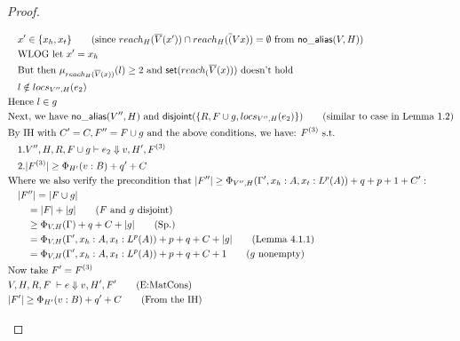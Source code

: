 \documentclass[11pt]{article}
\newcommand{\ms}[1]{\ensuremath{\mathsf{#1}}}
\newcommand{\na}[1]{\mathsf{no\_alias}(#1)}
\newcommand{\dist}[1]{\mathsf{disjoint}(#1)}
\begin{document}
\begin{proof}
\begin{description}
\begin{align*}
  &\quad x' \in \{x_h,x_t\} \tag{since $reach_H(\overline V (x')) \cap reach_H(\overline (Vx)) = \emptyset$ from $\na{V,H}$}\\
  &\quad \text{WLOG let } x' = x_h\\
  &\quad \text{But then } \mu_{reach_H(\overline V(x))}(l) \ge 2 \text{ and } \ms{set}(reach_(\overline V(x))) \text{ doesn't hold}\\
  &\quad l \notin locs_{V'',H}(e_2)\\
  &\text{Hence } l \in g\\
	&\text{Next, we have } \na{V'',H} \text{ and } \dist{\{R,F \cup g,locs_{V'',H}(e_2)\}} \tag{similar to case in Lemma 1.2}\\
	&\text{By IH with } C' = C, F'' = F \cup g \text{ and the above conditions, we have: } F^{(3)} \text{ s.t.}\\
	&\quad 1. V'',H,R,F\cup g \vdash e_2 \Downarrow v,H',F^{(3)}\\
	&\quad 2. |F^{(3)}| \ge \Phi_{H'}(v:B) + q' + C\\
	&\text{Where we also verify the precondition that } |F''| \ge \Phi_{V'',H}(\Gamma',x_h:A,x_t:L^p(A)) + q + p + 1 + C':\\
	&\quad |F''| = |F \cup g|\\
	&\quad \quad = |F| + |g| \tag{$F$ and $g$ disjoint}\\
	&\quad \quad \ge \Phi_{V,H}(\Gamma) + q + C + |g| \tag{Sp.}\\
	&\quad \quad = \Phi_{V,H}(\Gamma',x_h:A,x_t:L^p(A)) + p + q + C + |g| \tag{Lemma 4.1.1}\\
	&\quad \quad = \Phi_{V,H}(\Gamma',x_h:A,x_t:L^p(A)) + p + q + C + 1 \tag{$g$ nonempty}\\
	&\text{Now take } F' = F^{(3)}\\
	&V,H,R,F \; \vdash e \Downarrow v,H',F' \tag{E:MatCons}\\
  &|F'| \ge \Phi_{H'}(v:B) + q' + C \tag{From the IH}\\
  \end{align*}
  \end{description}
\end{proof}
\end{document}
